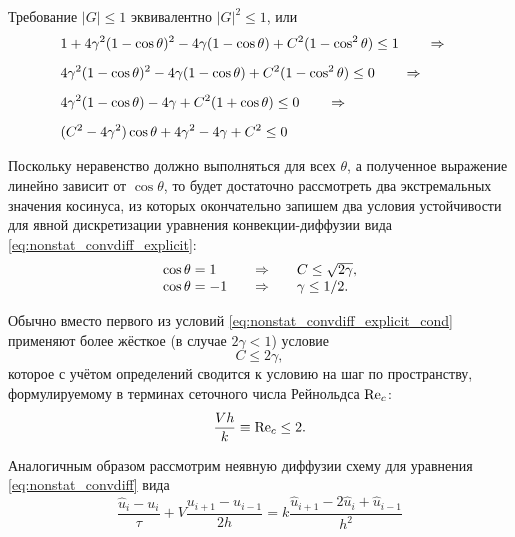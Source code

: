 Требование $|G| \leq 1$ эквивалентно $|G|^2 \leq 1$, или
\begin{align*}
    &1 + 4 \gamma^2(1-\cos\theta)^2 - 4\gamma(1-\cos\theta) + C^2 (1 - \cos^2\theta) \leq 1 \quad \quad\Rightarrow\quad \\[5pt]
    &4 \gamma^2(1-\cos\theta)^2 - 4\gamma(1-\cos\theta) + C^2 (1 - \cos^2\theta) \leq 0 \quad \quad\Rightarrow\quad \\[5pt]
    &4 \gamma^2(1-\cos\theta) - 4\gamma + C^2 (1 + \cos\theta) \leq 0 \quad \quad\Rightarrow\quad \\[5pt]
    &(C^2 - 4 \gamma^2) \cos\theta +4\gamma^2 - 4\gamma + C^2 \leq 0
\end{align*}

Поскольку неравенство должно выполняться для всех $\theta$,
а полученное выражение линейно зависит от $\cos\theta$, то будет достаточно рассмотреть два экстремальных значения косинуса,
из которых окончательно запишем два условия устойчивости для явной дискретизации уравнения конвекции-диффузии вида \eqref{eq:nonstat_convdiff_explicit}:
\begin{equation}
    \label{eq:nonstat_convdiff_explicit_cond}
    \begin{array}{lcl}
        \cos\theta = 1  & \quad\Rightarrow\quad & C \leq \sqrt{2\gamma}, \\
        \cos\theta = -1 & \quad\Rightarrow\quad & \gamma \leq 1/2.
    \end{array}
\end{equation}

Обычно вместо первого из условий \eqref{eq:nonstat_convdiff_explicit_cond} применяют
более жёсткое (в случае $2\gamma < 1$) условие
\begin{equation*}
    C \leq 2\gamma,
\end{equation*}
которое с учётом определений сводится к условию на шаг по пространству, формулируемому в терминах сеточного числа Рейнольдса $\mathrm{Re}_c$:
\begin{equation*}
    \frac{V h}{k} \equiv \mathrm{Re}_c \leq 2.
\end{equation*}

\label{sec:NonstatImpConvDiff}

Аналогичным образом рассмотрим неявную диффузии схему для уравнения \eqref{eq:nonstat_convdiff} вида
\begin{equation}
    \label{eq:nonstat_convdiff_semi_implicit}
    \frac{ \hat u_i - u_i}{\tau} + V\frac{ u_{i+1} - u_{i-1}}{2h} = k\frac{\hat u_{i+1} - 2 \hat u_{i} + \hat u_{i-1}}{h^2}
\end{equation}

